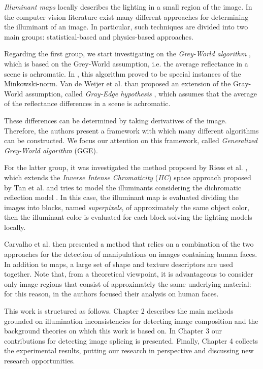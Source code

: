 \emph{Illuminant maps} locally describes the lighting in a small region of the image. In the computer vision literature exist many different approaches for determining the illuminant of an image. In particular, such techniques are divided into two main groups: statistical-based and physics-based approaches.

Regarding the first group, we start investigating on the \emph{Grey-World algorithm} \cite{Buchsbaum19801}, which is based on the Grey-World assumption, i.e. the average reflectance in a scene is achromatic. In \cite{finlayson2004shades}, this algorithm proved to be special instances of the Minkowski-norm. Van de Weijer et al. \cite{van2007edge} than proposed an extension of the Gray-World assumption, called \emph{Gray-Edge hypothesis} \cite{van2007edge}, which assumes that the average of the reflectance differences in a scene is achromatic. 

These differences can be determined by taking derivatives of the image. Therefore, the authors present a framework with which many different algorithms can be constructed.
We focus our attention on this framework, called \emph{Generalized Grey-World algorithm} (GGE).

For the latter group, it was investigated the method proposed by Riess et al. \cite{riess2010scene}, which extends the \emph{Inverse Intense Chromaticity} (\emph{IIC}) space approach proposed by Tan et al. \cite{tan2004color} and tries to model the illuminants considering the dichromatic reflection model \cite{tominaga1989standard}. In this case, the illuminant map is evaluated dividing the images into blocks, named \emph{superpixels}, of approximately the same object color, then the illuminant color is evaluated for each block solving the lighting models locally. 

Carvalho et al. \cite{carvalho2016illuminant} then presented a method that relies on a combination of the two approaches for the detection of manipulations on images containing human faces. In addition to maps, a large set of shape and texture descriptors are used together. Note that, from a theoretical viewpoint, it is advantageous to consider only image regions that consist of approximately the same underlying material: for this reason, in \cite{carvalho2016illuminant} the authors focused their analysis on human faces.

This work is structured as follows. Chapter 2 describes the main methods grounded on illumination inconsistencies for detecting image composition and the background theories on which this work is based on. In Chapter 3 our contributions for detecting image splicing is presented. Finally, Chapter 4 collects the experimental results, putting our research in perspective and discussing new research opportunities.